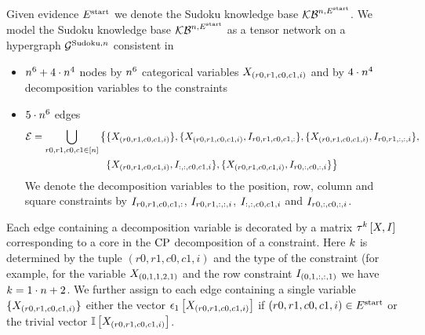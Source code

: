 \begin{example}
    Given evidence $E^{\mathrm{start}}$ we denote the Sudoku knowledge base $\mathcal{KB}^{n,E^{\mathrm{start}}}$.
    We model the Sudoku knowledge base $\mathcal{KB}^{n,E^{\mathrm{start}}}$ as a tensor network on a hypergraph $\mathcal{G}^{\mathrm{Sudoku},n}$ consistent in
    \begin{itemize}
        \item $n^6+4\cdot n^4$ nodes by $n^6$ categorical variables $X_{(r0,r1,c0,c1,i)}$ and by $4\cdot n^4$ decomposition variables to the constraints
        \item $5\cdot n^6$ edges
        \begin{align*}
            \mathcal{E}=
            \bigcup_{r0,r1,c0,c1\in[n]}
            \big\{
            &\{X_{(r0,r1,c0,c1,i)}\},\{X_{(r0,r1,c0,c1,i)},I_{r0,r1,c0,c1,:}\},\{X_{(r0,r1,c0,c1,i)},I_{r0,r1,:,:,i}\},\\
            &\{X_{(r0,r1,c0,c1,i)},I_{:,:,c0,c1,i}\},
            \{X_{(r0,r1,c0,c1,i)},I_{r0,:,c0,:,i}\}\big\}
        \end{align*}
        We denote the decomposition variables to the position, row, column and square constraints by $I_{r0,r1,c0,c1,:}$, $I_{r0,r1,:,:,i}$, $I_{:,:,c0,c1,i}$ and $I_{r0,:,c0,:,i}$.
    \end{itemize}
    Each edge containing a decomposition variable is decorated by a matrix $\tau^{k}\left[X,I\right]$ corresponding to a core in the $\mathrm{CP}$ decomposition of a constraint.
    Here $k$ is determined by the tuple $(r0,r1,c0,c1,i)$ and the type of the constraint (for example, for the variable $X_{(0,1,1,2,1)}$ and the row constraint $I_{(0,1,:,:,1)}$ we have $k=1\cdot n + 2$.
    We further assign to each edge containing a single variable $\{X_{(r0,r1,c0,c1,i)}\}$ either the vector $\epsilon_{1}\left[X_{(r0,r1,c0,c1,i)}\right]$ if $(r0,r1,c0,c1,i)\in E^{\mathrm{start}}$ or the trivial vector $\mathbb{I}\left[X_{(r0,r1,c0,c1,i)}\right]$.



\end{example}
